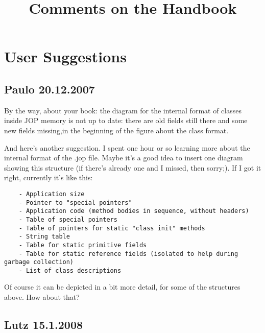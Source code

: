 \documentclass[a4paper,12pt]{scrartcl}
\begin{document}
\title{Comments on the Handbook}
\maketitle \thispagestyle{empty}

\section{User Suggestions}

\subsection{Paulo 20.12.2007}



By the way, about your book: the diagram for the internal format of
classes inside JOP memory is not up to date: there are old fields
still there and some new fields missing,in the beginning of the
figure about the class format.

And here's another suggestion. I spent one hour or so learning more
about the internal format of the .jop file. Maybe it's a good idea to
insert one diagram showing this structure (if there's already one and
I missed, then sorry;). If I got it right, currently it's like this:
\begin{verbatim}
    - Application size
    - Pointer to "special pointers"
    - Application code (method bodies in sequence, without headers)
    - Table of special pointers
    - Table of pointers for static "class init" methods
    - String table
    - Table for static primitive fields
    - Table for static reference fields (isolated to help during garbage collection)
    - List of class descriptions
\end{verbatim}

Of course it can be depicted in a bit more detail, for some of the
structures above. How about that?

\subsection{Lutz 15.1.2008}
\end{document}
